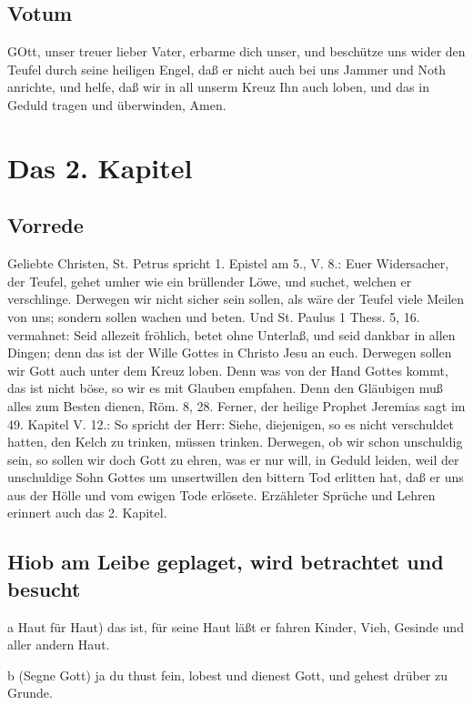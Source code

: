 \section{Votum}

GOtt, unser treuer lieber Vater, erbarme dich unser, und beschütze uns wider den Teufel durch seine heiligen Engel, daß er nicht auch bei uns Jammer und Noth anrichte, und helfe, daß wir in all unserm Kreuz Ihn auch loben, und das in Geduld tragen und überwinden, Amen.

\chapter{Das 2. Kapitel}

\section{Vorrede}

Geliebte Christen, St. Petrus spricht 1. Epistel am 5., V. 8.: Euer Widersacher, der Teufel, gehet umher wie ein brüllender Löwe, und suchet, welchen er verschlinge. Derwegen wir nicht sicher sein sollen, als wäre der Teufel viele Meilen von uns; sondern sollen wachen und beten. Und St. Paulus 1 Thess. 5, 16. vermahnet: Seid allezeit fröhlich, betet ohne Unterlaß, und seid dankbar in allen Dingen; denn das ist der Wille Gottes in Christo Jesu an euch. Derwegen sollen wir Gott auch unter dem Kreuz loben. Denn was von der Hand Gottes kommt, das ist nicht böse, so wir es mit Glauben empfahen. Denn den Gläubigen muß alles zum Besten dienen, Röm. 8, 28. Ferner, der heilige Prophet Jeremias sagt im 49. Kapitel V. 12.: So spricht der Herr: Siehe, diejenigen, so es nicht verschuldet hatten, den Kelch zu trinken, müssen trinken. Derwegen, ob wir schon unschuldig sein, so sollen wir doch Gott zu ehren, was er nur will, in Geduld leiden, weil der unschuldige Sohn Gottes um unsertwillen den bittern Tod erlitten hat, daß er uns aus der Hölle und vom ewigen Tode erlösete. Erzähleter Sprüche und Lehren erinnert auch das 2. Kapitel.

\section{Hiob am Leibe geplaget, wird betrachtet und besucht}

a Haut für Haut) das ist, für seine Haut läßt er fahren Kinder, Vieh, Gesinde und aller andern Haut.

b (Segne Gott) ja du thust fein, lobest und dienest Gott, und gehest drüber zu Grunde.


